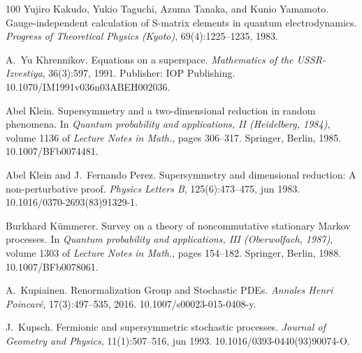 \documentclass{article}
\newcommand{\tmtextit}[1]{{\itshape{#1}}}
\begin{document}
\begin{thebibliography}{100}
  Yujiro Kakudo, Yukio Taguchi, Azuma Tanaka, and
  Kunio Yamamoto. {\newblock}Gauge-independent calculation of S-matrix
  elements in quantum electrodynamics. {\newblock}\tmtextit{Progress of
  Theoretical Physics (Kyoto)}, 69(4):1225--1235, 1983.{\newblock}
  
  A.~Yu Khrennikov.
  {\newblock}Equations on a superspace. {\newblock}\tmtextit{Mathematics of
  the USSR-Izvestiya}, 36(3):597, 1991. {\newblock}Publisher: IOP Publishing.
  \href{https://doi.org/10.1070/IM1991v036n03ABEH002036}{}10.1070/IM1991v036n03ABEH002036.{\newblock}
  
  Abel Klein. {\newblock}Supersymmetry
  and a two-dimensional reduction in random phenomena. {\newblock}In
  \tmtextit{Quantum probability and applications, II (Heidelberg, 1984)}, 
  volume  1136  of \tmtextit{Lecture Notes in Math.},  pages  306--317.
  Springer, Berlin, 1985.
  {\newblock}\href{Https://doi.org/10.1007/BFb0074481}{}10.1007/BFb0074481.{\newblock}
  
  Abel Klein  and  J.~Fernando Perez.
  {\newblock}Supersymmetry and dimensional reduction: A non-perturbative
  proof. {\newblock}\tmtextit{Physics Letters B}, 125(6):473--475, jun 1983.
  {\newblock}\href{Https://doi.org/10.1016/0370-2693(83)91329-1}{}10.1016/0370-2693(83)91329-1.{\newblock}
  
  Burkhard K{\"u}mmerer. {\newblock}Survey on a theory of
  noncommutative stationary Markov processes. {\newblock}In \tmtextit{Quantum
  probability and applications, III (Oberwolfach, 1987)},  volume  1303  of
  \tmtextit{Lecture Notes in Math.},  pages  154--182. Springer, Berlin, 1988.
  {\newblock}\href{Https://doi.org/10.1007/BFb0078061}{}10.1007/BFb0078061.{\newblock}
  
  A.~Kupiainen.
  {\newblock}Renormalization Group and Stochastic PDEs.
  {\newblock}\tmtextit{Annales Henri Poincar{\'e}}, 17(3):497--535, 2016.
  {\newblock}\href{Https://doi.org/10.1007/s00023-015-0408-y}{}10.1007/s00023-015-0408-y.{\newblock}
  
  J.~Kupsch. {\newblock}Fermionic and
  supersymmetric stochastic processes. {\newblock}\tmtextit{Journal of
  Geometry and Physics}, 11(1):507--516, jun 1993.
  {\newblock}\href{Https://doi.org/10.1016/0393-0440(93)90074-O}{}10.1016/0393-0440(93)90074-O.{\newblock}
  

\end{thebibliography}
\end{document}
